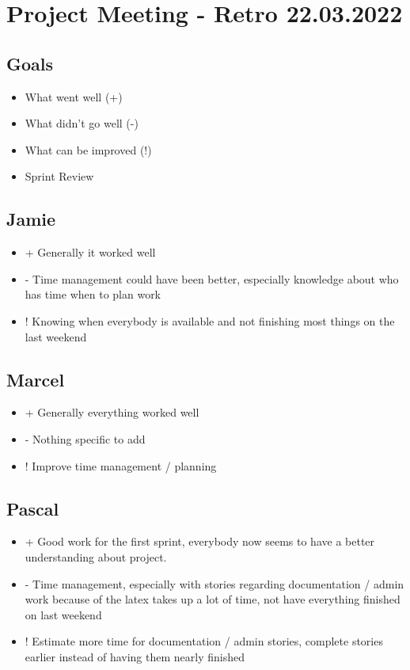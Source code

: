 \section{Project Meeting - Retro 22.03.2022}

\subsection{Goals}
\begin{itemize}
    \item What went well (+)
    \item What didn't go well (-)
    \item What can be improved (!)
    \item Sprint Review
\end{itemize}

\subsection{Jamie}
\begin{itemize}
    \item + Generally it worked well
    \item - Time management could have been better, especially knowledge about who has time when to plan work
    \item ! Knowing when everybody is available and not finishing most things on the last weekend
\end{itemize}

\subsection{Marcel}
\begin{itemize}
    \item + Generally everything worked well
    \item - Nothing specific to add
    \item ! Improve time management / planning
\end{itemize}

\subsection{Pascal}
\begin{itemize}
    \item + Good work for the first sprint, everybody now seems to have a better understanding about project.
    \item - Time management, especially with stories regarding documentation / admin work because of the latex takes up a lot of time, not have everything finished on last weekend
    \item ! Estimate more time for documentation / admin stories, complete stories earlier instead of having them nearly finished
\end{itemize}

